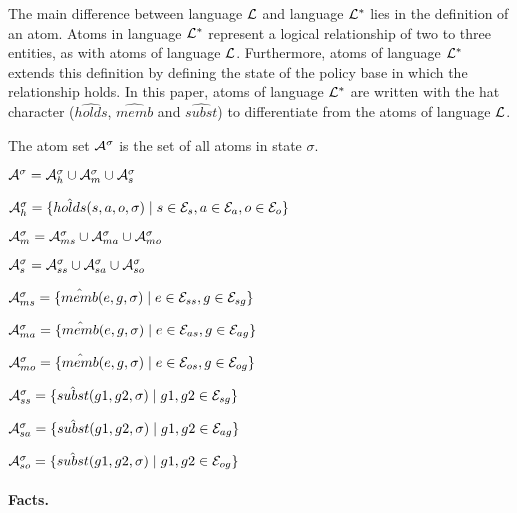 \documentclass[global,twocolumn,final]{svjour}
\newenvironment{vquote}
  {\begin{list}{}{\leftmargin 1em}\item[]}
  {\end{list}}
\begin{document}
          The main difference between language ${\cal L}$ and language
          ${\cal L}^{*}$ lies in the definition of an atom. Atoms in language
          ${\cal L}^{*}$ represent a logical relationship of two to three
          entities, as with atoms of language ${\cal L}$. Furthermore, atoms of
          language ${\cal L}^{*}$ extends this definition by defining the
          state of the policy base in which the relationship holds. In this
          paper, atoms of language ${\cal L}^{*}$ are written with the
          hat character ($\hat{holds}$, $\hat{memb}$ and $\hat{subst}$) to
          differentiate from the atoms of language ${\cal L}$.

          The atom set ${\cal A}^{\sigma}$ is the set of all atoms in state
          $\sigma$.

          \begin{vquote}
            ${\cal A}^{\sigma} = {\cal A}^{\sigma}_{h} \cup {\cal A}^{\sigma}_{m} \cup {\cal A}^{\sigma}_{s}$

            ${\cal A}^{\sigma}_{h} = \{\hat{holds}(s, a, o, \sigma) \mid s \in {\cal E}_{s}, a \in {\cal E}_{a}, o \in {\cal E}_{o}\}$

            ${\cal A}^{\sigma}_{m} = {\cal A}^{\sigma}_{ms} \cup {\cal A}^{\sigma}_{ma} \cup {\cal A}^{\sigma}_{mo}$

            ${\cal A}^{\sigma}_{s} = {\cal A}^{\sigma}_{ss} \cup {\cal A}^{\sigma}_{sa} \cup {\cal A}^{\sigma}_{so}$

            ${\cal A}^{\sigma}_{ms} = \{\hat{memb}(e, g, \sigma) \mid e \in {\cal E}_{ss}, g \in {\cal E}_{sg}\}$

            ${\cal A}^{\sigma}_{ma} = \{\hat{memb}(e, g, \sigma) \mid e \in {\cal E}_{as}, g \in {\cal E}_{ag}\}$

            ${\cal A}^{\sigma}_{mo} = \{\hat{memb}(e, g, \sigma) \mid e \in {\cal E}_{os}, g \in {\cal E}_{og}\}$

            ${\cal A}^{\sigma}_{ss} = \{\hat{subst}(g1, g2, \sigma) \mid g1, g2 \in {\cal E}_{sg}\}$

            ${\cal A}^{\sigma}_{sa} = \{\hat{subst}(g1, g2, \sigma) \mid g1, g2 \in {\cal E}_{ag}\}$

            ${\cal A}^{\sigma}_{so} = \{\hat{subst}(g1, g2, \sigma) \mid g1, g2 \in {\cal E}_{og}\}$
          \end{vquote}

        \paragraph{Facts.}
\end{document}
